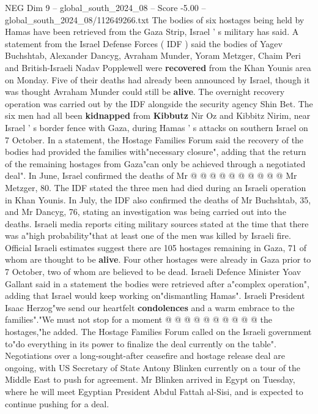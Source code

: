 \begin{textsample}{NEG Dim 9 – global\_south\_2024\_08 – Score -5.00 – global\_south\_2024\_08/112649266.txt}  \label{ex:f9_neg_383}
The bodies of six hostages being held by Hamas have been retrieved from the Gaza Strip, Israel ' s military has said.
A statement from the Israel Defense Forces ( IDF ) said the bodies of Yagev Buchshtab, Alexander Dancyg, Avraham Munder, Yoram Metzger, Chaim Peri and British-Israeli Nadav Popplewell were \textbf{recovered} from the Khan Younis area on Monday.
Five of their deaths had already been announced by Israel, though it was thought Avraham Munder could still be \textbf{alive}.
The overnight recovery operation was carried out by the IDF alongside the security agency Shin Bet.
The six men had all been \textbf{kidnapped} from \textbf{Kibbutz} Nir Oz and Kibbitz Nirim, near Israel ' s border fence with Gaza, during Hamas ' s attacks on southern Israel on 7 October.
In a statement, the Hostage Families Forum said the recovery of the bodies had provided the families with"necessary closure", adding that the return of the remaining hostages from Gaza"can only be achieved through a negotiated deal".
In June, Israel confirmed the deaths of Mr @ @ @ @ @ @ @ @ @ @ Mr Metzger, 80.
The IDF stated the three men had died during an Israeli operation in Khan Younis.
In July, the IDF also confirmed the deaths of Mr Buchshtab, 35, and Mr Dancyg, 76, stating an investigation was being carried out into the deaths.
Israeli media reports citing military sources stated at the time that there was a"high probability"that at least one of the men was killed by Israeli fire.
Official Israeli estimates suggest there are 105 hostages remaining in Gaza, 71 of whom are thought to be \textbf{alive}.
Four other hostages were already in Gaza prior to 7 October, two of whom are believed to be dead.
Israeli Defence Minister Yoav Gallant said in a statement the bodies were retrieved after a"complex operation", adding that Israel would keep working on"dismantling Hamas".
Israeli President Isaac Herzog"we send our heartfelt \textbf{condolences} and a warm embrace to the families"."We must not stop for a moment @ @ @ @ @ @ @ @ @ @ the hostages,"he added.
The Hostage Families Forum called on the Israeli government to"do everything in its power to finalize the deal currently on the table".
Negotiations over a long-sought-after ceasefire and hostage release deal are ongoing, with US Secretary of State Antony Blinken currently on a tour of the Middle East to push for agreement.
Mr Blinken arrived in Egypt on Tuesday, where he will meet Egyptian President Abdul Fattah al-Sisi, and is expected to continue pushing for a deal.

\end{textsample}
